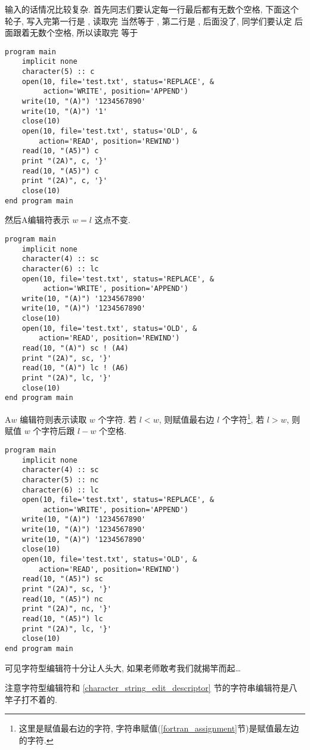 输入的话情况比较复杂. 首先同志们要认定每一行最后都有无数个空格, 下面这个轮子, 写入完第一行是 , 读取完  当然等于 , 第二行是 , 后面没了, 同学们要认定  后面跟着无数个空格, 所以读取完  等于  
\begin{lstlisting}
program main
    implicit none
    character(5) :: c
    open(10, file='test.txt', status='REPLACE', &
         action='WRITE', position='APPEND')
    write(10, "(A)") '1234567890'
    write(10, "(A)") '1'
    close(10)
    open(10, file='test.txt', status='OLD', &
        action='READ', position='REWIND')
    read(10, "(A5)") c
    print "(2A)", c, '}'
    read(10, "(A5)") c
    print "(2A)", c, '}'
    close(10)
end program main
\end{lstlisting}
然后A编辑符表示 $ w=l $ 这点不变. 
\begin{lstlisting}
program main
    implicit none
    character(4) :: sc
    character(6) :: lc
    open(10, file='test.txt', status='REPLACE', &
         action='WRITE', position='APPEND')
    write(10, "(A)") '1234567890'
    write(10, "(A)") '1234567890'
    close(10)
    open(10, file='test.txt', status='OLD', &
        action='READ', position='REWIND')
    read(10, "(A)") sc ! (A4)
    print "(2A)", sc, '}'
    read(10, "(A)") lc ! (A6)
    print "(2A)", lc, '}'
    close(10)
end program main
\end{lstlisting}
A$ w $ 编辑符则表示读取 $ w $ 个字符. 若 $ l<w $, 则赋值最右边 $ l $ 个字符\footnote{这里是赋值最右边的字符, 字符串赋值(\ref{fortran_assignment}节)是赋值最左边的字符.}, 若 $ l>w $, 则赋值 $ w $ 个字符后跟 $ l-w $ 个空格. 
\begin{lstlisting}
program main
    implicit none
    character(4) :: sc
    character(5) :: nc
    character(6) :: lc
    open(10, file='test.txt', status='REPLACE', &
         action='WRITE', position='APPEND')
    write(10, "(A)") '1234567890'
    write(10, "(A)") '1234567890'
    write(10, "(A)") '1234567890'
    close(10)
    open(10, file='test.txt', status='OLD', &
        action='READ', position='REWIND')
    read(10, "(A5)") sc
    print "(2A)", sc, '}'
    read(10, "(A5)") nc
    print "(2A)", nc, '}'
    read(10, "(A5)") lc
    print "(2A)", lc, '}'
    close(10)
end program main
\end{lstlisting}

可见字符型编辑符十分让人头大, 如果老师敢考我们就揭竿而起\dots{}

注意字符型编辑符和 \ref{character_string_edit_descriptor} 节的字符串编辑符是八竿子打不着的. 

